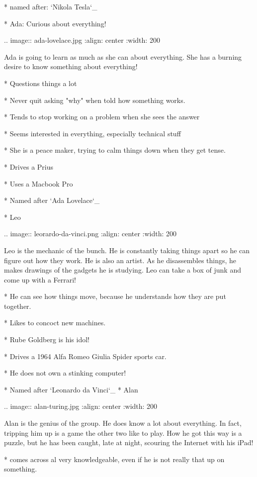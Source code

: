     * named after: `Nikola Tesla`_
    

* Ada:  Curious about everything!

..  image:: ada-lovelace.jpg
    :align: center
    :width: 200

Ada is going to learn as much as she can about everything. She has a burning
desire to know something about everything!

    * Questions things a lot

    * Never quit asking "why" when told how something works.

    * Tends to stop working on a problem when she sees the answer

    * Seems interested in everything, especially technical stuff

    * She is a peace maker, trying to calm things down when they get tense.

    * Drives a Prius

    * Uses a Macbook Pro

    * Named after `Ada Lovelace`_

* Leo

..  image:: leorardo-da-vinci.png
    :align: center
    :width: 200

Leo is the mechanic of the bunch. He is constantly taking things apart so he
can figure out how they work. He is also an artist. As he disassembles things,
he makes drawings of the gadgets he is studying. Leo can take a box of junk and
come up with a Ferrari!

    * He can see how things move, because he understands how they are put together.

    * Likes to concoct new machines.

    * Rube Goldberg is his idol!

    * Drives a 1964 Alfa Romeo Giulia Spider sports car.

    * He does not own a stinking computer!

    * Named after `Leonardo da Vinci`_
* Alan

..  image:: alan-turing.jpg
    :align: center
    :width: 200

Alan is the genius of the group. He does know a lot about everything. In fact,
tripping him up is a game the other two like to play. How he got this way is a
puzzle, but he has been caught, late at night, scouring the Internet with his
iPad!

    * comes across al very knowledgeable, even if he is not really that up on
      something.

